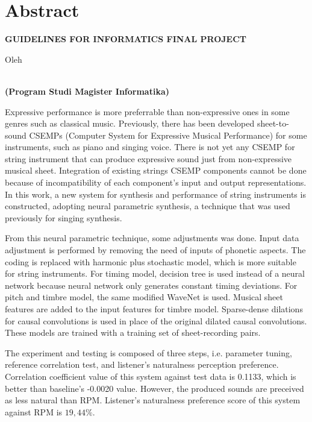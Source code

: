 \clearpage
\chapter*{Abstract}
\begin{center}
	\singlespacing
    \large \bfseries \MakeUppercase{Guidelines for Informatics Final Project} %

    \normalsize \normalfont Oleh

    \bfseries \large \theauthor\\
    \normalsize (Program Studi Magister Informatika)
    \bigskip
\end{center}

\begin{singlespace}

Expressive performance is more preferrable than non-expressive ones in some genres such as classical music. Previously, there has been developed sheet-to-sound CSEMPs (Computer System for Expressive Musical Performance) for some instruments, such as piano and singing voice. There is not yet any CSEMP for string instrument that can produce expressive sound just from non-expressive musical sheet. Integration of existing strings CSEMP components cannot be done because of incompatibility of each component's input and output representations. In this work, a new system for synthesis and performance of string instruments is constructed, adopting neural parametric synthesis, a technique that was used previously for singing synthesis.

From this neural parametric technique, some adjustments was done. Input data adjustment is performed by removing the need of inputs of phonetic aspects. The coding is replaced with harmonic plus stochastic model, which is more suitable for string instruments. For timing model, decision tree is used instead of a neural network because neural network only generates constant timing deviations. For pitch and timbre model, the same modified WaveNet is used. Musical sheet features are added to the input features for timbre model. Sparse-dense dilations for causal convolutions is used in place of the original dilated causal convolutions. These models are trained with a training set of sheet-recording pairs.

The experiment and testing is composed of three steps, i.e. parameter tuning, reference correlation test, and listener's naturalness perception preference. Correlation coefficient value of this system against test data is 0.1133, which is better than baseline's -0.0020 value. However, the produced sounds are preceived as less natural than RPM. Listener's naturalness preference score of this system against RPM is $19,44\%$.

\end{singlespace}
\clearpage